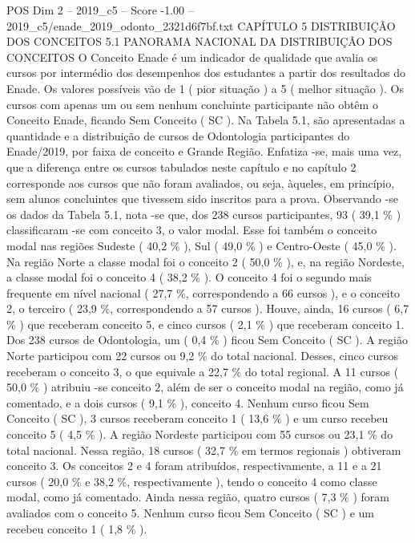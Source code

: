 \begin{textsample}{POS Dim 2 – 2019\_c5 – Score -1.00 – 2019\_c5/enade\_2019\_odonto\_2321d6f7bf.txt}  \label{ex:f2_pos_343}
CAPÍTULO 5 DISTRIBUIÇÃO DOS CONCEITOS 5.1 PANORAMA NACIONAL DA DISTRIBUIÇÃO DOS CONCEITOS O Conceito Enade é um indicador de qualidade que avalia os cursos por intermédio dos desempenhos dos estudantes a partir dos resultados do Enade.
Os valores possíveis vão de 1 ( pior situação ) a 5 ( melhor situação ).
Os cursos com apenas um ou sem nenhum concluinte participante não obtêm o Conceito Enade, ficando Sem Conceito ( SC ).
Na Tabela 5.1, são apresentadas a quantidade e a distribuição de cursos de Odontologia participantes do Enade/2019, por faixa de conceito e Grande Região.
Enfatiza -se, mais uma vez, que a diferença entre os cursos tabulados neste capítulo e no capítulo 2 corresponde aos cursos que não foram avaliados, ou seja, àqueles, em princípio, sem alunos concluintes que tivessem sido inscritos para a prova.
Observando -se os dados da Tabela 5.1, nota -se que, dos 238 cursos participantes, 93 ( 39,1 \% ) classificaram -se com conceito 3, o valor modal.
Esse foi também o conceito modal nas regiões Sudeste ( 40,2 \% ), Sul ( 49,0 \% ) e Centro-Oeste ( 45,0 \% ).
Na região Norte a classe modal foi o conceito 2 ( 50,0 \% ), e, na região Nordeste, a classe modal foi o conceito 4 ( 38,2 \% ).
O conceito 4 foi o segundo mais frequente em nível nacional ( 27,7 \%, correspondendo a 66 cursos ), e o conceito 2, o terceiro ( 23,9 \%, correspondendo a 57 cursos ).
Houve, ainda, 16 cursos ( 6,7 \% ) que receberam conceito 5, e cinco cursos ( 2,1 \% ) que receberam conceito 1.
Dos 238 cursos de Odontologia, um ( 0,4 \% ) ficou Sem Conceito ( SC ).
A região Norte participou com 22 cursos ou 9,2 \% do total nacional.
Desses, cinco cursos receberam o conceito 3, o que equivale a 22,7 \% do total regional.
A 11 cursos ( 50,0 \% ) atribuiu -se conceito 2, além de ser o conceito modal na região, como já comentado, e a dois cursos ( 9,1 \% ), conceito 4.
Nenhum curso ficou Sem Conceito ( SC ), 3 cursos receberam conceito 1 ( 13,6 \% ) e um curso recebeu conceito 5 ( 4,5 \% ).
A região Nordeste participou com 55 cursos ou 23,1 \% do total nacional.
Nessa região, 18 cursos ( 32,7 \% em termos regionais ) obtiveram conceito 3.
Os conceitos 2 e 4 foram atribuídos, respectivamente, a 11 e a 21 cursos ( 20,0 \% e 38,2 \%, respectivamente ), tendo o conceito 4 como classe modal, como já comentado.
Ainda nessa região, quatro cursos ( 7,3 \% ) foram avaliados com o conceito 5.
Nenhum curso ficou Sem Conceito ( SC ) e um recebeu conceito 1 ( 1,8 \% ).

\end{textsample}
